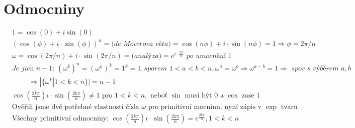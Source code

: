 \documentclass[a4paper]{article}
\newcommand{\tab}{\hspace{1cm}}
\begin{document}
\renewcommand{\headrulewidth}{0pt} %
\thispagestyle{fancy} %
{}

\section*{Odmocniny}
\begin{align*}
	& 1 = \cos(0) + i\sin(0) \\
	& (\cos(\phi)+i\cdot \sin(\phi))^n = \textit{(de Moivrova věta)} = \cos(n\phi) + i\cdot \sin(n\phi) = 1 \Rightarrow \phi = 2\pi/n \\
	& \omega = \cos(2\pi/n)+i\cdot \sin(2\pi/n) = \textit{(analýza)} = e^{i\cdot \frac{2\pi}{n}} \textit{ po umocnění $1$}\\
	& \textit{Je jich $n-1$: } (\omega^k)^n = (\omega^n)^k = 1^k = 1, \textit{sporem } 1 < a < b < n, \omega^a=\omega^b \Rightarrow \omega^{a-b} = 1 \Rightarrow \textit{ spor s výběrem } a, b \\  
	& \tab \Rightarrow |\{\omega^k| 1 < k < n\}| = n-1 \\	
	& \cos(\frac{2k\pi}{n}) i\cdot \sin(\frac{2k\pi}{n}) \ne 1 \text{ pro } 1 < k < n, \text{ neboť $\sin$ musí být $0$ a $\cos$ zase $1$} \\
	& \text{Ověřili jsme dvě potřebné vlastnosti čísla $\omega$ pro primitivní mocninu, nyní zápis v $\exp$ tvaru} \\
	& \text{Všechny primitivní odmocniny: } \cos(\frac{2k\pi}{n}) i\cdot \sin(\frac{2k\pi}{n}) = e^{\frac{2k\pi}{n}}, 1 < k < n
\end{align*}
\end{document}
